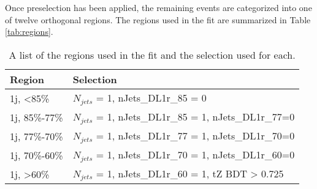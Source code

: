 Once preselection has been applied, the remaining events are categorized into one of twelve orthogonal regions. The regions used in the fit are summarized in Table \ref{tab:regions}.

\begin{table}[H] 
\centering
\caption{A list of the regions used in the fit and the selection used for each.}
\begin{tabular}{l|l}
\hline\hline
Region & Selection            \\
\hline
\hline
1j, <85\%       & $N_{jets}$ = 1, nJets\_DL1r\_85 = 0            \\
1j, 85\%-77\%   & $N_{jets}$ = 1, nJets\_DL1r\_85 = 1, nJets\_DL1r\_77=0                     \\
1j, 77\%-70\%   & $N_{jets}$ = 1, nJets\_DL1r\_77 = 1, nJets\_DL1r\_70=0                     \\
1j, 70\%-60\%   & $N_{jets}$ = 1, nJets\_DL1r\_70 = 1, nJets\_DL1r\_60=0                      \\
1j, >60\%       & $N_{jets}$ = 1, nJets\_DL1r\_60 = 1, tZ BDT > 0.725 \\

\end{tabular}
\end{table}
